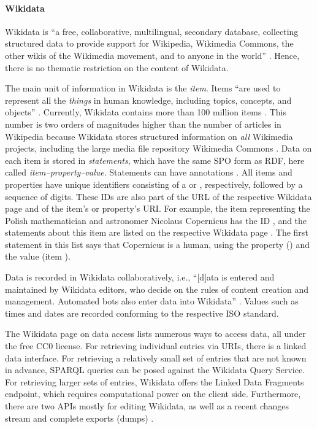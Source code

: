 \paragraph{Wikidata}

Wikidata \autocite{Wikidata} is \enquote{a free, collaborative, multilingual, secondary database, collecting structured data to provide support for Wikipedia, Wikimedia Commons, the other wikis of the Wikimedia movement, and to anyone in the world} \autocite{Wikidata_intro}. Hence, there is no thematic restriction
on the content of Wikidata.

The main unit of information in Wikidata is the \emph{item}. Items \enquote{are used to represent all the \emph{things} in human knowledge, including topics, concepts, and objects} \autocite{Wikidata_items}.
Currently, Wikidata contains more than 100 million items \autocite{Wikidata_data_access}.
This number is two orders of magnitudes higher than the number of articles in Wikipedia
because Wikidata stores structured information on \emph{all} Wikimedia projects,
including the large media file repository Wikimedia Commons \autocite[cf.][]{Wikidata_items}.
Data on each item is stored in \emph{statements}, which have the same \gls{SPO}
form as \gls{RDF}, here called \emph{item--property--value}.
Statements can have annotations
\autocite[cf.][]{Wikidata_statements}. All items and properties have unique identifiers
consisting of a  or , respectively, followed by a sequence of digits.
These IDs are also part of the URL of the respective Wikidata page
and of the item's or property's URI.
For example, the item representing the 
Polish mathematician and astronomer Nicolaus Copernicus has the ID ,
and the statements about this item are listed on the respective Wikidata page \autocite[cf.][]{Wikidata_Copernicus}.
The first statement in this list says that Copernicus is a human,
using the property  () and the value 
(item ).

Data is recorded in Wikidata collaboratively,
i.e., \enquote{[d]ata is entered and maintained by Wikidata editors, who decide on the rules of content creation and management. Automated bots also enter data into Wikidata}
\autocite{Wikidata_intro}.
Values such as times and dates are recorded conforming to the respective \gls{ISO} standard.

The Wikidata page on data access \autocite{Wikidata_data_access} lists numerous ways to access data,
all under the free CC0 license.
For retrieving individual entries via URIs, there is a linked data interface.
For retrieving a relatively small set of entries that are not known in advance,
SPARQL queries can be posed against the Wikidata Query Service.
For retrieving larger sets of entries, Wikidata offers the Linked Data Fragments endpoint,
which requires computational power on the client side.
Furthermore, there are two APIs mostly for editing Wikidata,
as well as a recent changes stream and complete exports (dumps)
\autocite[cf.][]{Wikidata_data_access}.


